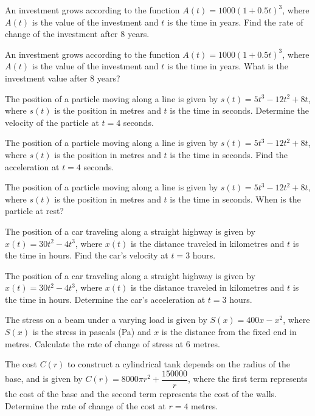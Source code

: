 \documentclass[11pt,a4paper]{article}
\begin{document}
\begin{longlist}
\item An investment grows according to the function $A(t)=1000(1+0.5t)^3$, where $A(t)$ is the value of the investment and $t$ is the time in years. Find the rate of change of the investment after 8 years.

\item An investment grows according to the function $A(t)=1000(1+0.5t)^3$, where $A(t)$ is the value of the investment and $t$ is the time in years. What is the investment value after 8 years?

\item The position of a particle moving along a line is given by $s(t)=5t^3-12t^2+8t$, where $s(t)$ is the position in metres and $t$ is the time in seconds. Determine the velocity of the particle at $t=4$ seconds.

\item The position of a particle moving along a line is given by $s(t)=5t^3-12t^2+8t$, where $s(t)$ is the position in metres and $t$ is the time in seconds. Find the acceleration at $t=4$ seconds.

\item The position of a particle moving along a line is given by $s(t)=5t^3-12t^2+8t$, where $s(t)$ is the position in metres and $t$ is the time in seconds. When is the particle at rest?

\item The position of a car traveling along a straight highway is given by $x(t)=30t^2-4t^3$, where $x(t)$ is the distance traveled in kilometres and $t$ is the time in hours. Find the car's velocity at $t=3$ hours.

\item The position of a car traveling along a straight highway is given by $x(t)=30t^2-4t^3$, where $x(t)$ is the distance traveled in kilometres and $t$ is the time in hours. Determine the car's acceleration at $t=3$ hours.

\item The stress on a beam under a varying load is given by $S(x)=400x-x^2$, where $S(x)$ is the stress in pascals (Pa) and $x$ is the distance from the fixed end in metres. Calculate the rate of change of stress at 6 metres.

\item The cost $C(r)$ to construct a cylindrical tank depends on the radius of the base, and is given by $C(r) =8000\pi r^2+\dfrac{150000}{r}$, where the first term represents the cost of the base and the second term represents the cost of the walls. Determine the rate of change of the cost at $r=4$ metres.


\end{longlist}
\end{document}

